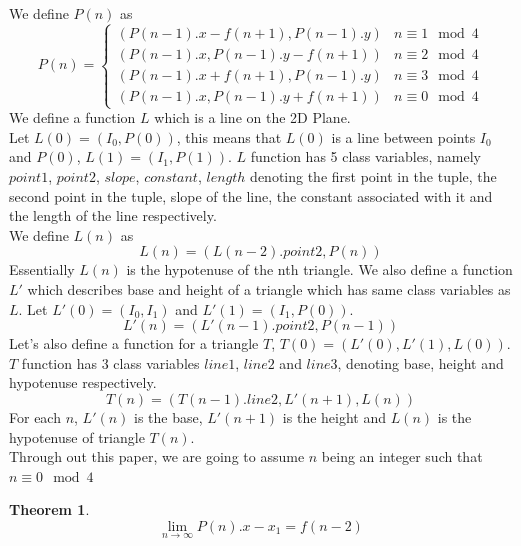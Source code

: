 \documentclass{article}
\newtheorem{theorem}{Theorem}[section]
\begin{document}
We define $P(n)$ as
\begin{equation*}
    P(n) = \begin{cases}
            (P(n - 1).x - f(n + 1), P(n - 1).y) & n \equiv 1\mod 4\\
            (P(n - 1).x, P(n - 1).y - f(n + 1)) & n \equiv 2\mod 4\\
            (P(n - 1).x + f(n + 1), P(n - 1).y) & n \equiv 3\mod 4\\
            (P(n - 1).x, P(n - 1).y + f(n + 1)) & n \equiv 0\mod 4
            \end{cases}
\end{equation*}
We define a function $L$ which is a line on the 2D Plane.\\
Let $L(0) = (I_0, P(0))$, this means that $L(0)$ is a line between points $I_0$ and $P(0)$, $L(1) = (I_1, P(1))$. $L$ function has 5 class variables, namely $point1$, $point2$, $slope$, $constant$, $length$ denoting the first point in the tuple, the second point in the tuple, slope of the line, the constant associated with it and the length of the line respectively.\\
We define $L(n)$ as $$L(n) = (L(n - 2).point2, P(n))$$ 
Essentially $L(n)$ is the hypotenuse of the nth triangle.
We also define a function $L'$ which describes base and height of a triangle which has same class variables as $L$.
Let $L'(0) = (I_0, I_1)$ and $L'(1) = (I_1, P(0))$.
$$L'(n) = (L'(n - 1).point2, P(n - 1))$$
Let's also define a function for a triangle $T$, $T(0) = (L'(0), L'(1), L(0))$. $T$ function has 3 class variables $line1$, $line2$ and $line3$, denoting base, height and hypotenuse respectively.
$$T(n) = (T(n - 1).line2, L'(n + 1), L(n))$$
For each $n$, $L'(n)$ is the base, $L'(n + 1)$ is the height and $L(n)$ is the hypotenuse of triangle $T(n)$.\\
Through out this paper, we are going to assume $n$ being an integer such that $n \equiv 0\mod4$
\begin{theorem}
	\label{lim-P}
$$\lim_{n \to \infty} P(n).x - x_1 = f(n - 2)$$
\end{theorem}
\end{document}
